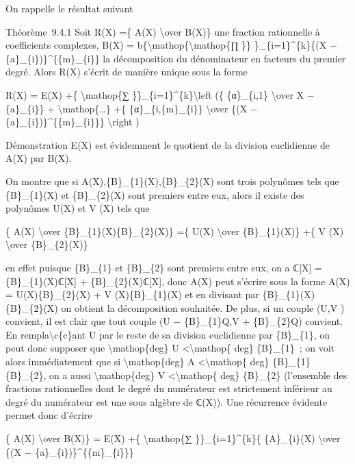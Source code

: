 \documentclass[]{article}
\begin{document}
On rappelle le résultat suivant

Théorème~9.4.1 Soit R(X) =\{ A(X) \textbackslash{}over B(X)\} une
fraction rationnelle à coefficients complexes, B(X) =
b\{\textbackslash{}mathop\{\textbackslash{}mathop\{∏ \}\}
\}\_\{i=1\}\^{}\{k\}\{(X − \{a\}\_\{i\})\}\^{}\{\{m\}\_\{i\}\} la
décomposition du dénominateur en facteurs du premier degré. Alors R(X)
s'écrit de manière unique sous la forme

R(X) = E(X) +\{ \textbackslash{}mathop\{∑
\}\}\_\{i=1\}\^{}\{k\}\textbackslash{}left (\{ \{α\}\_\{i,1\}
\textbackslash{}over X − \{a\}\_\{i\}\} +
\textbackslash{}mathop\{\ldots{}\} +\{ \{α\}\_\{i,\{m\}\_\{i\}\}
\textbackslash{}over \{(X − \{a\}\_\{i\})\}\^{}\{\{m\}\_\{i\}\}\}
\textbackslash{}right )

Démonstration E(X) est évidemment le quotient de la division euclidienne
de A(X) par B(X).

On montre que si A(X),\{B\}\_\{1\}(X),\{B\}\_\{2\}(X) sont trois
polynômes tels que \{B\}\_\{1\}(X) et \{B\}\_\{2\}(X) sont premiers
entre eux, alors il existe des polynômes U(X) et V (X) tels que

\{ A(X) \textbackslash{}over \{B\}\_\{1\}(X)\{B\}\_\{2\}(X)\} =\{ U(X)
\textbackslash{}over \{B\}\_\{1\}(X)\} +\{ V (X) \textbackslash{}over
\{B\}\_\{2\}(X)\}

en effet puisque \{B\}\_\{1\} et \{B\}\_\{2\} sont premiers entre eux,
on a ℂ{[}X{]} = \{B\}\_\{1\}(X)ℂ{[}X{]} + \{B\}\_\{2\}(X)ℂ{[}X{]}, donc
A(X) peut s'écrire sous la forme A(X) = U(X)\{B\}\_\{2\}(X) + V
(X)\{B\}\_\{1\}(X) et en divisant par \{B\}\_\{1\}(X)\{B\}\_\{2\}(X) on
obtient la décomposition souhaitée. De plus, si un couple (U,V )
convient, il est clair que tout couple (U − \{B\}\_\{1\}Q,V +
\{B\}\_\{2\}Q) convient. En rempla\textbackslash{}c\{c\}ant U par le
reste de sa division euclidienne par \{B\}\_\{1\}, on peut donc supposer
que \textbackslash{}mathop\{deg\} U \textless{}\textbackslash{}mathop\{
deg\} \{B\}\_\{1\}~; on voit alors immédiatement que si
\textbackslash{}mathop\{deg\} A \textless{}\textbackslash{}mathop\{
deg\} \{B\}\_\{1\}\{B\}\_\{2\}, on a aussi \textbackslash{}mathop\{deg\}
V \textless{}\textbackslash{}mathop\{ deg\} \{B\}\_\{2\} (l'ensemble des
fractions rationnelles dont le degré du numérateur est strictement
inférieur au degré du numérateur est une sous algèbre de ℂ(X)). Une
récurrence évidente permet donc d'écrire

\{ A(X) \textbackslash{}over B(X)\} = E(X) +\{ \textbackslash{}mathop\{∑
\}\}\_\{i=1\}\^{}\{k\}\{ \{A\}\_\{i\}(X) \textbackslash{}over \{(X −
\{a\}\_\{i\})\}\^{}\{\{m\}\_\{i\}\}\}
\end{document}
